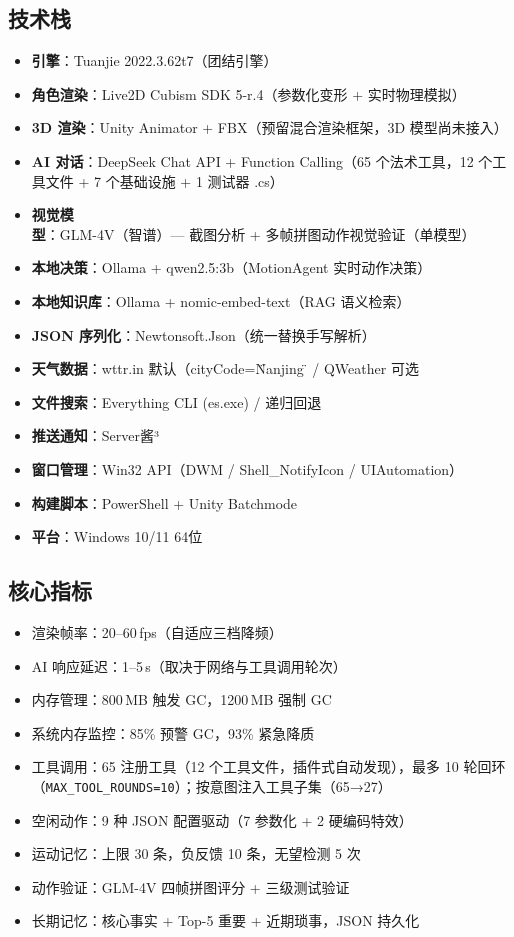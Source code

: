 \documentclass[12pt,a4paper]{ctexart}
\begin{document}
\subsection{技术栈}

\begin{itemize}
    \item \textbf{引擎}：Tuanjie 2022.3.62t7（团结引擎）
    \item \textbf{角色渲染}：Live2D Cubism SDK 5-r.4（参数化变形 + 实时物理模拟）
    \item \textbf{3D 渲染}：Unity Animator + FBX（预留混合渲染框架，3D 模型尚未接入）
    \item \textbf{AI 对话}：DeepSeek Chat API + Function Calling（65 个法术工具，12 个工具文件 + 7 个基础设施 + 1 测试器 .cs）
    \item \textbf{视觉模型}：GLM-4V（智谱）--- 截图分析 + 多帧拼图动作视觉验证（单模型）
    \item \textbf{本地决策}：Ollama + qwen2.5:3b（MotionAgent 实时动作决策）
    \item \textbf{本地知识库}：Ollama + nomic-embed-text（RAG 语义检索）
    \item \textbf{JSON 序列化}：Newtonsoft.Json（统一替换手写解析）
    \item \textbf{天气数据}：wttr.in 默认（cityCode=\"Nanjing\"） / QWeather 可选
    \item \textbf{文件搜索}：Everything CLI (es.exe) / 递归回退
    \item \textbf{推送通知}：Server酱³
    \item \textbf{窗口管理}：Win32 API（DWM / Shell\_NotifyIcon / UIAutomation）
    \item \textbf{构建脚本}：PowerShell + Unity Batchmode
    \item \textbf{平台}：Windows 10/11 64位
\end{itemize}

\subsection{核心指标}

\begin{itemize}
    \item 渲染帧率：20--60\,fps（自适应三档降频）
    \item AI 响应延迟：1--5\,s（取决于网络与工具调用轮次）
    \item 内存管理：800\,MB 触发 GC，1200\,MB 强制 GC
    \item 系统内存监控：85\% 预警 GC，93\% 紧急降质
    \item 工具调用：65 注册工具（12 个工具文件，插件式自动发现），最多 10 轮回环（\texttt{MAX\_TOOL\_ROUNDS=10}）；按意图注入工具子集（65→27）
    \item 空闲动作：9 种 JSON 配置驱动（7 参数化 + 2 硬编码特效）
    \item 运动记忆：上限 30 条，负反馈 10 条，无望检测 5 次
    \item 动作验证：GLM-4V 四帧拼图评分 + 三级测试验证
    \item 长期记忆：核心事实 + Top-5 重要 + 近期琐事，JSON 持久化
\end{itemize}
\end{document}
